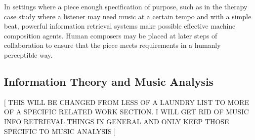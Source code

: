 \documentclass[final,authoryear,11pt,times]{elsarticle}
\begin{document}
In settings where a piece enough specification of purpose, such as in the therapy case study where a listener may need music at a certain tempo and with a simple beat, powerful information retrieval systems make possible effective machine composition agents. Human composers may be placed at later steps of collaboration to ensure that the piece meets requirements in a humanly perceptible way.

\subsection{Information Theory and Music Analysis}

[ THIS WILL BE CHANGED FROM LESS OF A LAUNDRY LIST TO MORE OF A SPECIFIC RELATED WORK SECTION. I WILL GET RID OF MUSIC INFO RETRIEVAL THINGS IN GENERAL AND ONLY KEEP THOSE SPECIFIC TO MUSIC ANALYSIS ]
\end{document}
